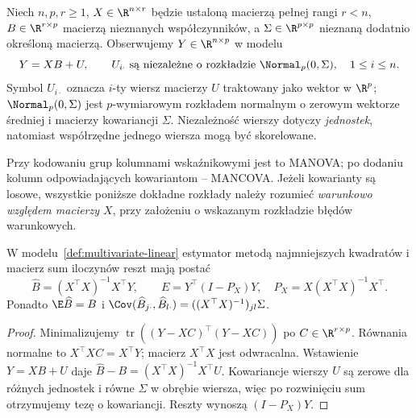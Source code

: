 \begin{definicja}\label{def:multivariate-linear}
Niech $n,p,r\ge1$, $X\in\R^{n\times r}$ będzie ustaloną macierzą pełnej rangi $r<n$, $B\in\R^{r\times p}$ macierzą nieznanych współczynników, a $\Sigma\in\R^{p\times p}$ nieznaną dodatnio określoną macierzą. Obserwujemy $Y\in\R^{n\times p}$ w modelu
\[
 Y=XB+U,\qquad U_{i\cdot}\ \text{są niezależne o rozkładzie }\Normal_p(0,\Sigma),\quad 1\le i\le n.
\]
Symbol $U_{i\cdot}$ oznacza $i$-ty wiersz macierzy $U$ traktowany jako wektor w $\R^p$; $\Normal_p(0,\Sigma)$ jest $p$-wymiarowym rozkładem normalnym o zerowym wektorze średniej i macierzy kowariancji $\Sigma$. Niezależność wierszy dotyczy \emph{jednostek}, natomiast współrzędne jednego wiersza mogą być skorelowane.
\end{definicja}

Przy kodowaniu grup kolumnami wskaźnikowymi jest to MANOVA; po dodaniu kolumn odpowiadających kowariantom -- MANCOVA. Jeżeli kowarianty są losowe, wszystkie poniższe dokładne rozkłady należy rozumieć \emph{warunkowo względem macierzy $X$}, przy założeniu o wskazanym rozkładzie błędów warunkowych.

\begin{stwierdzenie}\label{prop:multiv-ols}
W modelu~\ref{def:multivariate-linear} estymator metodą najmniejszych kwadratów i macierz sum iloczynów reszt mają postać
\[
 \widehat B=(X^\top X)^{-1}X^\top Y,\qquad E=Y^\top(I-P_X)Y,\quad P_X=X(X^\top X)^{-1}X^\top.
\]
Ponadto $\E\widehat B=B$ i $\Cov(\widehat B_{j\cdot},\widehat B_{l\cdot})=((X^\top X)^{-1})_{jl}\Sigma$.
\end{stwierdzenie}
\begin{proof}
Minimalizujemy $\operatorname{tr}((Y-XC)^\top(Y-XC))$ po $C\in\R^{r\times p}$. Równania normalne to $X^\top XC=X^\top Y$; macierz $X^\top X$ jest odwracalna. Wstawienie $Y=XB+U$ daje $\widehat B-B=(X^\top X)^{-1}X^\top U$. Kowariancje wierszy $U$ są zerowe dla różnych jednostek i równe $\Sigma$ w obrębie wiersza, więc po rozwinięciu sum otrzymujemy tezę o kowariancji. Reszty wynoszą $(I-P_X)Y$.
\end{proof}

